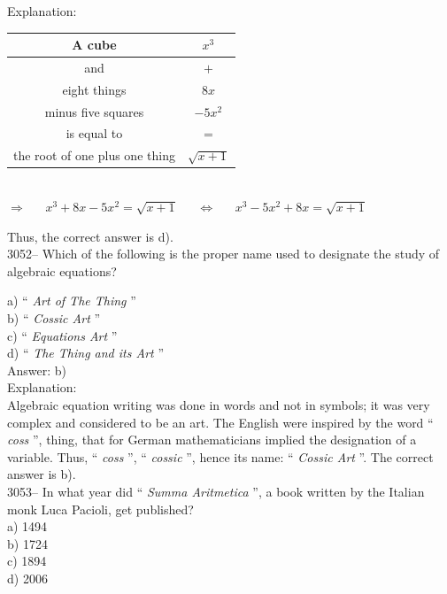 \documentclass[letterpaper, 12pt]{article}
\begin{document}
Explanation:\\
\begin{center}
\begin{tabular}{|c|c|}\hline
A cube & $x^{3}$\\ \hline
and & $+$\\ \hline
eight things & $8x$\\ \hline
minus five squares & $-5x^{2}$\\ \hline
is equal to & $=$\\ \hline
the root of one plus one thing & $\sqrt{x + 1}$\\ \hline
\end{tabular}\\[4mm]
$\Longrightarrow \ \ \ \ \ \ \ x^{3} + 8x - 5x^{2} = \sqrt{x + 1} \ \ \ \ \ \ \ \Longleftrightarrow \ \ \ \ \ \ \ x^{3} - 5x^{2} + 8x = \sqrt{x + 1}$
\end{center}
Thus, the correct answer is d).\\


3052-- Which of the following is the proper name used to designate the study of algebraic equations?

a) `` \emph{Art of The Thing} ''\\
b) `` \emph{Cossic Art} ''\\
c) `` \emph{Equations Art} ''\\
d) `` \emph{The Thing and its Art} ''\\

Answer: b)\\

Explanation:\\
Algebraic equation writing was done in words and not in symbols; it was very complex and considered to be an art. The English were inspired by the word `` \emph{coss} '', thing, that for German mathematicians implied the designation of a variable. Thus, `` \emph{coss} '', `` \emph{cossic} '', hence its name: `` \emph{Cossic Art} ''. The correct answer is b).\\



3053-- In what year did `` \emph{Summa Aritmetica} '', a book written by the Italian monk Luca Pacioli, get published?\\

a) 1494\\
b) 1724\\
c) 1894\\
d) 2006\\
\end{document}

